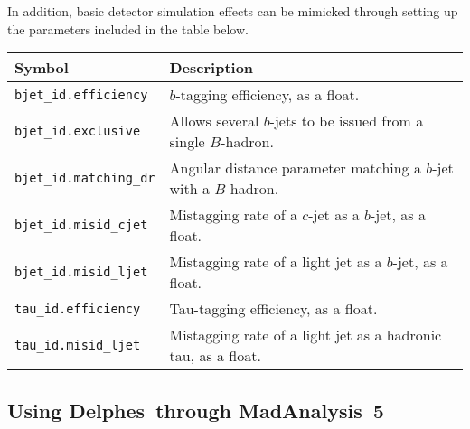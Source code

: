 \documentclass[a4paper]{article}
\newcommand{\MAnorm}{{MadAnalysis}~5}
\newcommand{\DELnorm}{{Delphes}}
\begin{document}
\vspace{0.1cm}
\noindent In addition, basic detector simulation effects can be mimicked through setting
up the parameters included in the table below.
\renewcommand{\arraystretch}{1.2}%
\begin{center}\begin{tabular}{l p{8.4cm}}
\hline
Symbol& Description\\
\hline
\color{ao} \verb?bjet_id.efficiency? & $b$-tagging efficiency, as a float.\\
\color{ao} \verb?bjet_id.exclusive? & Allows several $b$-jets to be issued from a single
  $B$-hadron.\\
\color{ao} \verb?bjet_id.matching_dr? & Angular distance parameter matching a $b$-jet
  with a $B$-hadron.\\
\color{ao} \verb?bjet_id.misid_cjet? & Mistagging rate of a $c$-jet as a $b$-jet, as
  a float.\\
\color{ao} \verb?bjet_id.misid_ljet? & Mistagging rate of a light jet as a $b$-jet,
  as a float.\\
\color{ao} \verb?tau_id.efficiency? & Tau-tagging efficiency, as a float.\\
\color{ao} \verb?tau_id.misid_ljet? &  Mistagging rate of a light jet as a hadronic tau,
   as a float.\\
\hline
\end{tabular}
\end{center}

\vspace{2cm}

\begin{shaded}
\section{\Large Using \DELnorm\ through \MAnorm}
\end{shaded}
\end{document}
